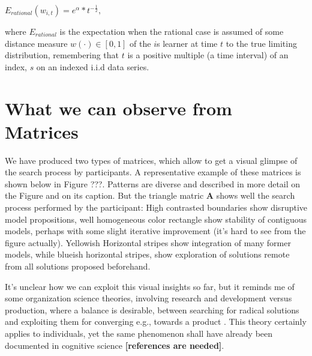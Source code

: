 \documentclass{article}
\begin{document}
$E_{rational}(w_{i,t}) =e^{\alpha}*t^{-\frac{1}{2}},$

where $E_{rational}$ is the expectation when the rational case is assumed of some distance measure $w(\cdot) \in [0,1]$ of the $i$s learner at time $t$ to the true limiting distribution, remembering that $t$ is a positive multiple (a time interval) of an index, $s$ on an indexed i.i.d data series. 

\section{What we can observe from Matrices} We have produced two types of matrices, which allow to get a visual glimpse of the search process by participants. A representative example of these matrices is shown below in Figure ???. Patterns are diverse and described in more detail on the Figure and on its caption. But the triangle matric {\bf A} shows well the search process performed by the participant: High contrasted boundaries show disruptive model propositions, well homogeneous color rectangle show stability of contiguous models, perhaps with some slight iterative improvement (it's hard to see from the figure actually). Yellowish Horizontal stripes show integration of many former models, while blueish horizontal stripes, show exploration of solutions remote from all solutions proposed beforehand.  

It's unclear how we can exploit this visual insights so far, but it reminds me of some organization science theories, involving research and development versus production, where a balance is desirable, between searching for radical solutions and exploiting them for converging e.g., towards a product \cite{March_1991}. This theory certainly applies to individuals, yet the same phenomenon shall have already been documented in cognitive science {\bf [references are needed]}. 
  
  
\end{document}
